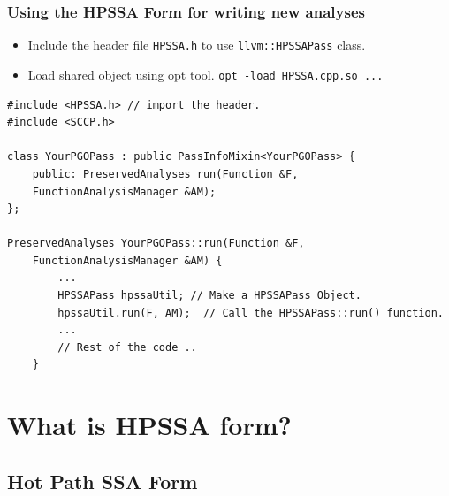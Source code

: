 \documentclass[aspectratio=169, compress]{beamer}
\begin{document}
\begin{frame}[fragile]
	\frametitle{Using the HPSSA Form for writing new analyses}
	\begin{itemize}
		\item Include the header file \texttt{HPSSA.h} to use  \texttt{llvm::HPSSAPass} class.
		\item Load shared object using opt tool. \texttt{opt -load HPSSA.cpp.so ...} 
	\end{itemize}
	\begin{verbatim}
#include <HPSSA.h> // import the header.
#include <SCCP.h>

class YourPGOPass : public PassInfoMixin<YourPGOPass> {
	public: PreservedAnalyses run(Function &F, 
	FunctionAnalysisManager &AM);
};

PreservedAnalyses YourPGOPass::run(Function &F, 
	FunctionAnalysisManager &AM) {
		...
		HPSSAPass hpssaUtil; // Make a HPSSAPass Object.
		hpssaUtil.run(F, AM);  // Call the HPSSAPass::run() function.
		...
		// Rest of the code ..
	}
	\end{verbatim}
\end{frame}
\section{What is HPSSA form?}
\subsection{Hot Path SSA Form}
{
	
}
\end{document}
